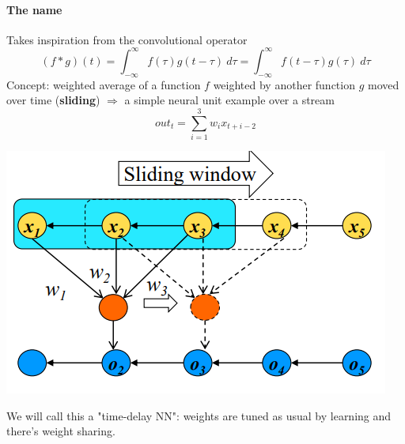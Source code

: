 \documentclass[10pt]{report}
\begin{document}
\paragraph{The name} Takes inspiration from the convolutional operator $$(f * g)(t) = \int_{-\infty}^\infty f(\tau)g(t-\tau)\:d\tau = \int_{-\infty}^\infty f(t- \tau)g(\tau)\:d\tau$$
Concept: weighted average of a function $f$ weighted by another function $g$ moved over time (\textbf{sliding}) $\Rightarrow$ a simple neural unit example over a stream
$$out_t = \sum_{i=1}^3w_ix_{t+i-2}$$
\begin{center}
	\includegraphics[scale=0.5]{26.png}
\end{center}
We will call this a "time-delay NN": weights are tuned as usual by learning and there's weight sharing.
\end{document}

